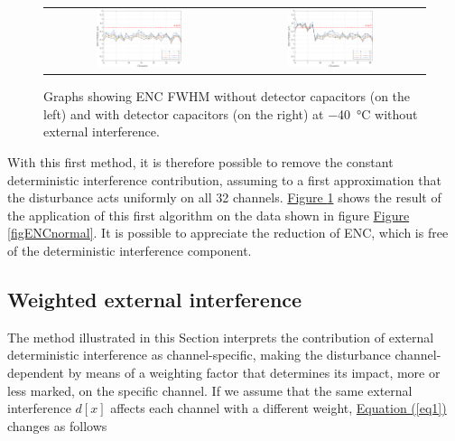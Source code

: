 \begin{figure}[h!]
    \centering
    \begin{tabular}{cc}
         \includegraphics[width=0.475\textwidth]{Images/chap1/results/ENC_minus40C/ASIC_cold_wocaps_wo_mean.pdf} &  \includegraphics[width=0.475\textwidth]{Images/chap1/results/ENC_minus40C/ASIC_cold_wcaps_wo_mean.pdf} \\
    \end{tabular}
    \caption{Graphs showing ENC FWHM without detector capacitors (on the left) and with detector capacitors (on the right) at \SI{-40}{\celsius} without external interference.}
    \label{figENCwomean}
\end{figure}

\noindent
With this first method, it is therefore possible to remove the constant deterministic interference contribution, assuming to a first approximation that the disturbance acts uniformly on all 32 channels. \hyperref[figENCwomean]{Figure \ref{figENCwomean}} shows the result of the application of this first algorithm on the data shown in figure \hyperref[figENCnormal]{Figure \ref{figENCnormal}}. It is possible to appreciate the reduction of ENC, which is free of the deterministic interference component.

\subsection{Weighted external interference}
The method illustrated in this Section interprets the contribution of external deterministic interference as channel-specific, making the disturbance channel-dependent by means of a weighting factor that determines its impact, more or less marked, on the specific channel. If we assume that the same external interference $d[x]$ affects each channel with a different weight, \hyperref[eq1]{Equation (\ref{eq1})} changes as follows

